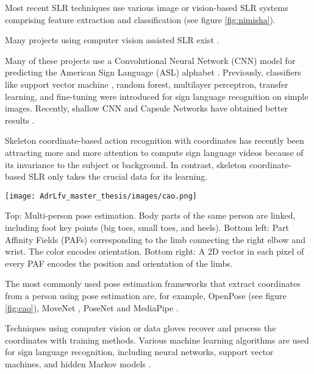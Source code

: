Most recent SLR techniques use various image or vision-based SLR systems comprising feature extraction and classification \cite{nimisha2020brief} (see figure \ref{fig:nimisha}). 

Many projects using computer vision assisted SLR exist \cite{admasu2010ethiopian} \cite{deriche2019intelligent} \cite{ahram2021advances} \cite{song2021intelligent} \cite{lee2021american} \cite{lee2021comparative} \cite{gao2021rnn}. 

Many of these projects use a Convolutional Neural Network (CNN) model for predicting the American Sign Language (ASL) alphabet \cite{bin2019study}. Previously, classifiers like support vector machine \cite{savur2015real}, random forest, multilayer perceptron, transfer learning, and fine-tuning \cite{saleh2020arabic} were introduced for sign language recognition on simple images. Recently, shallow CNN and Capsule Networks have obtained better results \cite{hasan2020classification}. 

Skeleton coordinate-based action recognition with coordinates has recently been attracting more and more attention to compute sign language videos because of its invariance to the subject or background. In contrast, skeleton coordinate-based SLR only takes the crucial data for its learning. 

\begin{marginfigure}
    \centering
    \texttt{[image: AdrLfv\_master\_thesis/images/cao.png]}
    \caption{Top: Multi-person pose estimation. Body parts of the same person are linked, including foot key points (big toes, small toes, and heels). Bottom left: Part Affinity Fields (PAFs) corresponding to the limb connecting the right elbow and wrist. The color encodes orientation. Bottom right: A 2D vector in each pixel of every PAF encodes the position and orientation of the limbs.}
    \label{fig:cao}
\end{marginfigure}

The most commonly used pose estimation frameworks that extract coordinates from a person using pose estimation are, for example, OpenPose \cite{cao2017realtime} (see figure \ref{fig:cao}), MoveNet \cite{movenet}, PoseNet \cite{kendall2015posenet} and MediaPipe \cite{lugaresi2019mediapipe}.



Techniques using computer vision or data gloves recover and process the coordinates with training methods. Various machine learning algorithms are used for sign language recognition, including neural networks, support vector machines, and hidden Markov models \cite{9178440}.

